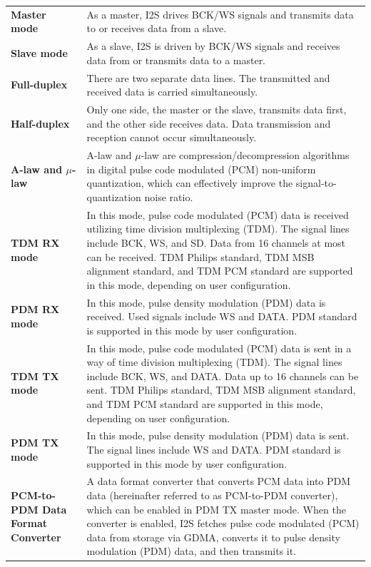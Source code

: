 \documentclass[main\_\_EN.tex]{subfiles}
\begin{document}
\begin{longtable}[c]{ R{6cm} p{10cm} }
    \textbf{Master mode}     & As a master, I2S drives BCK/WS signals and transmits data to or receives data from a slave. \\ 
    \textbf{Slave mode}      & As a slave, I2S is driven by BCK/WS signals and receives data from or transmits data to a master. \\
    \textbf{Full-duplex} & There are two separate data lines. The transmitted and received data is carried simultaneously.\\
    \textbf{Half-duplex} & Only one side, the master or the slave, transmits data first, and the other side receives data. Data transmission and reception cannot occur simultaneously.\\
    \textbf{A-law and $\mu$-law} & A-law and \textrm{$\mu$}-law are compression/decompression algorithms in digital pulse code modulated (PCM) non-uniform quantization, which can effectively improve the signal-to-quantization noise ratio. \\
    \textbf{TDM RX mode} & In this mode, pulse code modulated (PCM) data is received utilizing time division multiplexing (TDM). The signal lines include BCK, WS, and SD. Data from 16 channels at most can be received. TDM Philips standard, TDM MSB alignment standard, and TDM PCM standard are supported in this mode, depending on user configuration.\\
    \textbf{PDM RX mode} & In this mode, pulse density modulation (PDM) data is received. Used signals include WS and DATA. PDM standard is supported in this mode by user configuration.\\
    \textbf{TDM TX mode} & In this mode, pulse code modulated (PCM) data is sent in a way of time division multiplexing (TDM). The signal lines include BCK, WS, and DATA. Data up to 16 channels can be sent. TDM Philips standard, TDM MSB alignment standard, and TDM PCM standard are supported in this mode, depending on user configuration.\\
    \textbf{PDM TX mode} & In this mode, pulse density modulation (PDM) data is sent. The signal lines include WS and DATA. PDM standard is supported in this mode by user configuration.\\
    \textbf{PCM-to-PDM Data Format Converter} & A data format converter that converts PCM data into PDM data (hereinafter referred to as PCM-to-PDM converter), which can be enabled in PDM TX master mode. When the converter is enabled, I2S fetches pulse code modulated (PCM) data from storage via GDMA, converts it to pulse density modulation (PDM) data, and then transmits it.\\
\end{longtable}
\end{document}

